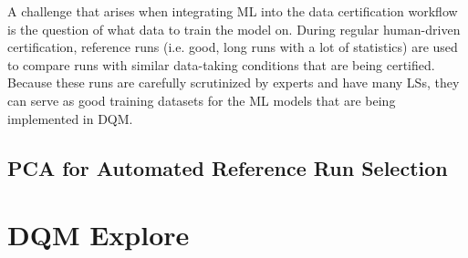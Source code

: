 A challenge that arises when integrating ML into the data certification workflow is the question of what data to train the model on. During regular human-driven certification, reference runs (i.e. good, long runs with a lot of statistics) are used to compare runs with similar data-taking conditions that are being certified. Because these runs are carefully scrutinized by experts and have many LSs, they can serve as good training datasets for the ML models that are being implemented in DQM. 

\subsection{}

\subsection{PCA for Automated Reference Run Selection}

\section{DQM Explore}
